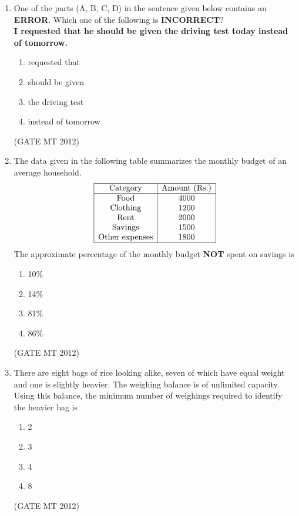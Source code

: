 \documentclass[journal, 11pt, onecolumn]{IEEEtran}
\theoremstyle{remark}
\begin{document}
\begin{enumerate}
\begin{enumerate}
\item One of the parts (A, B, C, D) in the sentence given below contains an \textbf{ERROR}. Which one of the following is \textbf{INCORRECT}?\\[0.5em]
\textbf{I requested that he should be given the driving test today instead of tomorrow.}
\begin{multicols}{2}
\begin{enumerate}  
\item requested that
\item should be given
\item the driving test
\item instead of tomorrow
\end{enumerate}
\end{multicols}
\hfill(GATE MT 2012)

\item The data given in the following table summarizes the monthly budget of an average household.
\[
    \begin{array}{|c|c|}
    \hline
    \text{Category} & \text{Amount (Rs.)} \\
    \hline
    \text{Food}        & 4000 \\
    \text{Clothing}    & 1200 \\
    \text{Rent}        & 2000 \\
    \text{Savings}     & 1500 \\
    \text{Other expenses} & 1800 \\
    \hline
    \end{array}
\]
The approximate percentage of the monthly budget \textbf{NOT} spent on savings is
\begin{multicols}{2}
\begin{enumerate}  
\item 10\%
\item 14\%
\item 81\%
\item 86\%
\end{enumerate}
\end{multicols}
\hfill(GATE MT 2012)

\item There are eight bags of rice looking alike, seven of which have equal weight and one is slightly heavier. The weighing balance is of unlimited capacity. Using this balance, the minimum number of weighings required to identify the heavier bag is
\begin{multicols}{2}
\begin{enumerate}  
\item 2
\item 3
\item 4
\item 8
\end{enumerate}
\end{multicols}
\hfill(GATE MT 2012)


\end{enumerate}
\end{enumerate}
\end{document}
